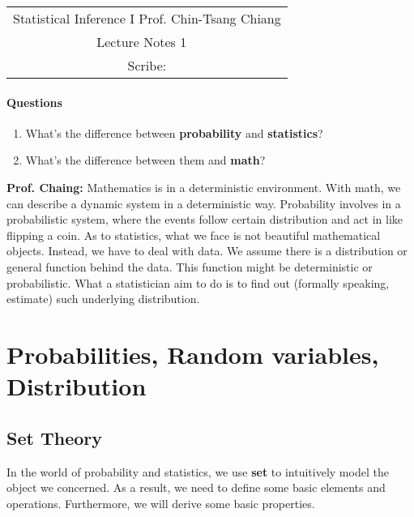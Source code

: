 \documentclass[../Probability_Theory.tex]{subfiles}
\begin{document}
	\begin{center}
		\renewcommand{\arraystretch}{2}
		\begin{bfseries}
			\begin{tabular}{|c|}
				\hline
				Statistical Inference I \hfill Prof. Chin-Tsang Chiang\\
				\hspace{15em} {\large Lecture Notes 1} \hspace{15em}\ \\
				\lecdate \hfill Scribe: \scribe\\
				\hline
			\end{tabular}
			\renewcommand{\arraystretch}{1}
		\end{bfseries}
	\end{center}
\paragraph{Questions}
\begin{enumerate}
	\item What's the difference between {\bf probability} and {\bf statistics}?
	\item What's the difference between them and {\bf math}?
\end{enumerate}
{\bf Prof. Chaing:}
Mathematics is in a  {\color{red} deterministic}  environment. With math, we can describe a dynamic system in a deterministic way. Probability involves in a probabilistic system, where the events follow certain distribution and act in like flipping a coin. As to statistics, what we face is not beautiful mathematical objects. Instead, we have to deal with {\color{red} data}. We assume there is a distribution or general function behind the data. This function might be deterministic or probabilistic. What a statistician aim to do is to find out (formally speaking, estimate) such underlying distribution.

\section{Probabilities, Random variables, Distribution}
\subsection{Set Theory}
In the world of probability and statistics, we use {\bf set} to intuitively model the object we concerned. As a result, we need to define some basic elements and operations. Furthermore, we will derive some basic properties.
\end{document}
